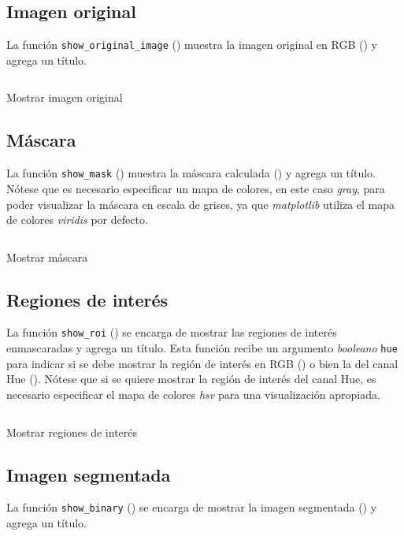 \subsection{Imagen original}
La función \texttt{show\_original\_image} () muestra la imagen original en \textsf{RGB} () y agrega un título.

\begin{listing}[!ht]
\inputminted{python}{code_listings/show_original_image.py}
\caption{Mostrar imagen original}
\label{code:show_original_image}
\end{listing}

\subsection{Máscara}
La función \texttt{show\_mask} () muestra la máscara calculada () y agrega un título. Nótese que es necesario especificar un mapa de colores, en este caso \textit{gray}, para poder visualizar la máscara en escala de grises, ya que \textit{matplotlib} utiliza el mapa de colores \textit{viridis} por defecto.

\begin{listing}[!ht]
\inputminted{python}{code_listings/show_mask.py}
\caption{Mostrar máscara}
\label{code:show_mask}
\end{listing}

\subsection{Regiones de interés}
La función \texttt{show\_roi} () se encarga de mostrar las regiones de interés enmascaradas y agrega un título. Esta función recibe un argumento \textit{booleano} \texttt{hue} para indicar si se debe mostrar la región de interés en \textsf{RGB} () o bien la del canal Hue (). Nótese que si se quiere mostrar la región de interés del canal Hue, es necesario especificar el mapa de colores \textit{hsv} para una visualización apropiada.

\begin{listing}[!ht]
\inputminted{python}{code_listings/show_roi.py}
\caption{Mostrar regiones de interés}
\label{code:show_roi}
\end{listing}

\subsection{Imagen segmentada}
La función \texttt{show\_binary} () se encarga de mostrar la imagen segmentada () y agrega un título.

